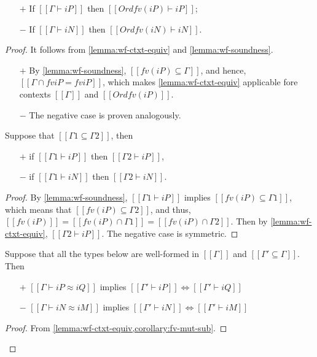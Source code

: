 \begin{corollary}
  \label{corollary:wf-ctxt-strengthening}
  \hfill
  
  \begin{itemize}
    \item [$+$] If $[[Γ ⊢ iP]]$ then $[[Ord fv(iP) ⊢ iP]]$;
    \item [$-$] If $[[Γ ⊢ iN]]$ then $[[Ord fv(iN) ⊢ iN]]$.
  \end{itemize}
\end{corollary}
\begin{proof}
  It follows from \cref{lemma:wf-ctxt-equiv} and \cref{lemma:wf-soundness}.
  \begin{itemize}
    \item [$+$] 
      By \cref{lemma:wf-soundness}, $[[fv(iP) ⊆ {Γ}]]$, and hence,
      $[[{Γ} ∩ fv iP = fv iP ]]$, which makes \cref{lemma:wf-ctxt-equiv}
      applicable fore contexts $[[Γ]]$ and $[[Ord fv(iP)]]$.
    \item[$-$] The negative case is proven analogously.
  \end{itemize}

\begin{corollary}
  \label{lemma:wf-weakening}
  Suppose that $[[{Γ1} ⊆ {Γ2}]]$, then
  \begin{itemize}
    \item[$+$] if $[[Γ1 ⊢ iP]]$ then $[[Γ2 ⊢ iP]]$,
    \item[$-$] if $[[Γ1 ⊢ iN]]$ then $[[Γ2 ⊢ iN]]$.
  \end{itemize}
\end{corollary}
\begin{proof}
  By \cref{lemma:wf-soundness},
  $[[Γ1 ⊢ iP]]$ implies $[[fv(iP) ⊆ {Γ1}]]$,
  which means that $[[fv(iP) ⊆ {Γ2}]]$,
  and thus, $[[fv(iP)]] = [[fv(iP) ∩ {Γ1}]] = [[fv(iP) ∩ {Γ2}]]$.
  Then by \cref{lemma:wf-ctxt-equiv}, $[[Γ2 ⊢ iP]]$. 
  The negative case is symmetric.
\end{proof}


\begin{corollary}
  \label{lemma:mut-sub-types-wf-equiv}
  Suppose that all the types below are well-formed in $[[Γ]]$ and
  $[[{Γ'} ⊆ {Γ}]]$. Then
  \begin{itemize}
  \item[$+$] $[[Γ ⊢ iP ≈ iQ]]$ implies $[[Γ' ⊢ iP]] \iff [[Γ' ⊢ iQ]]$
  \item[$-$] $[[Γ ⊢ iN ≈ iM]]$ implies $[[Γ' ⊢ iN]] \iff [[Γ' ⊢ iM]]$
  \end{itemize}
\end{corollary}
\begin{proof}
  From \cref{lemma:wf-ctxt-equiv,corollary:fv-mut-sub}.
\end{proof}




\end{proof}
